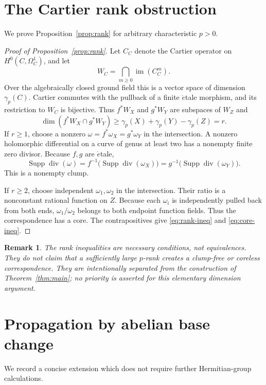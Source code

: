 \documentclass[11pt,a4paper,reqno]{amsart}
\newtheorem{remark}[theorem]{Remark}
\newcommand{\Div}{\operatorname{div}}
\begin{document}
\section{The Cartier rank obstruction}\label{sec:cartier}
We prove Proposition~\ref{prop:rank} for arbitrary characteristic
$p>0$.

\begin{proof}[Proof of Proposition~\ref{prop:rank}]
Let $C_C$ denote the Cartier operator on
$H^0(C,\Omega_C^1)$, and let
\[
  W_C=\bigcap_{m\ge0}\operatorname{im}(C_C^m).
\]
Over the algebraically closed ground field this is a vector space of
dimension $\gamma_p(C)$. Cartier commutes with the pullback of a
finite \(\acute{e}\)tale morphism, and its restriction to $W_C$ is
bijective. Thus $f^*W_X$ and $g^*W_Y$ are subspaces of $W_Z$ and
\[
 \dim(f^*W_X\cap g^*W_Y)
 \ge \gamma_p(X)+\gamma_p(Y)-\gamma_p(Z)=r.
\]
If $r\ge1$, choose a nonzero
$\omega=f^*\omega_X=g^*\omega_Y$ in the intersection.
A nonzero holomorphic differential on a curve of genus at least two
has a nonempty finite zero divisor. Because $f,g$ are
\(\acute{e}\)tale,
\[
 \operatorname{Supp}\Div(\omega)
 =f^{-1}\bigl(\operatorname{Supp}\Div(\omega_X)\bigr)
 =g^{-1}\bigl(\operatorname{Supp}\Div(\omega_Y)\bigr).
\]
This is a nonempty clump.

If $r\ge2$, choose independent $\omega_1,\omega_2$ in the
intersection. Their ratio is a nonconstant rational function on $Z$.
Because each $\omega_i$ is independently pulled back from both ends,
$\omega_1/\omega_2$ belongs to both endpoint function fields.
Thus the correspondence has a core. The contrapositives give
\eqref{eq:rank-ineq} and \eqref{eq:core-ineq}.
\end{proof}

\begin{remark}
The rank inequalities are necessary conditions, not equivalences.
They do not claim that a sufficiently large $p$-rank creates a
clump-free or coreless correspondence. They are intentionally
separated from the construction of Theorem~\ref{thm:main}; no
priority is asserted for this elementary dimension argument.
\end{remark}

\section{Propagation by abelian base change}\label{sec:propagation}
We record a concise extension which does not require further
Hermitian-group calculations.
\end{document}
